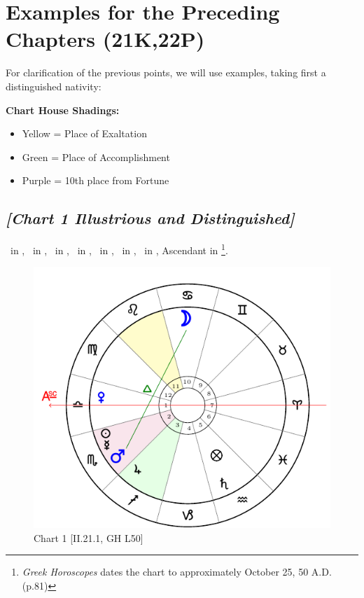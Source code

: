 \section{Examples for the Preceding Chapters (21K,22P)}
For clarification of the previous points, we will use examples, taking first a distinguished nativity:

\begin{mdframed}[backgroundcolor=cyan!5]
\textbf{Chart House Shadings:}
\vspace{-1em}
\begin{itemize}
 \setlength\itemsep{-0.5em}
\item Yellow = Place of Exaltation
\item Green = Place of Accomplishment
\item Purple = 10th place from Fortune
\end{itemize}
\vspace{-1em}
\end{mdframed}

\subsection*{\textit{[Chart 1 Illustrious and Distinguished]}}

\Sun\, in \Scorpio, \Moon\, in \Cancer, \Saturn\, in \Aquarius, \Jupiter\, in \Sagittarius, \Mars\, in \Scorpio, \Venus\, in \Libra, \Mercury\, in \Scorpio, Ascendant in \Libra
\footnote{\textit{Greek Horoscopes} dates the chart to approximately October 25, 50 A.D. (p.81)}. 

\clearpage
\begin{figure}
\centering
\vspace{-20pt}
\includegraphics[width=.68\textwidth]{charts/2_21_1}
\caption{Chart 1 [II.21.1, GH L50]}
\label{fig:chart01}
\end{figure}

